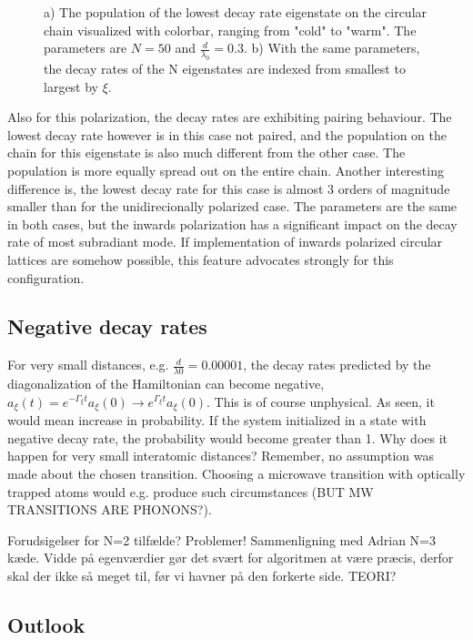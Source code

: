 \documentclass{article}
\begin{document}
\begin{figure}[H]
\begin{subfigure}[b]{0.49\textwidth}
        \caption{}
        \label{fig:circular_inwards_decayrates}
    \end{subfigure}
    \caption{a) The population of the lowest decay rate eigenstate on the circular chain visualized with colorbar, ranging from "cold" to "warm". The parameters are $N=50$ and $\frac{d}{\lambda_0}=0.3$. b) With the same parameters, the decay rates of the N eigenstates are indexed from smallest to largest by $\xi$. }
    \label{fig:circular_inwards}
\end{figure}

Also for this polarization, the decay rates are exhibiting pairing behaviour. The lowest decay rate however is in this case not paired, and the population on the chain for this eigenstate is also much different from the other case. The population is more equally spread out on the entire chain. Another interesting difference is, the lowest decay rate for this case is almost 3 orders of magnitude smaller than for the unidirecionally polarized case. The parameters are the same in both cases, but the inwards polarization has a significant impact on the decay rate of most subradiant mode. If implementation of inwards polarized circular lattices are somehow possible, this feature advocates strongly for this configuration. 

\subsection{Negative decay rates}

For very small distances, e.g. $\frac{d}{\lambda0} = 0.00001$, the decay rates predicted by the diagonalization of the Hamiltonian can become negative, $a_\xi(t)=e^{-\Gamma_\xi t} a_\xi (0) \rightarrow e^{\Gamma_\xi t} a_\xi (0)$. This is of course unphysical. As seen, it would mean increase in probability. If the system initialized in a state with negative decay rate, the probability would become greater than 1. Why does it happen for very small interatomic distances? Remember, no assumption was made about the chosen transition. Choosing a microwave transition with optically trapped atoms would e.g. produce such circumstances (BUT MW TRANSITIONS ARE PHONONS?). 

Forudsigelser for N=2 tilfælde? Problemer! Sammenligning med Adrian N=3 kæde. Vidde på egenværdier gør det svært for algoritmen at være præcis, derfor skal der ikke så meget til, før vi havner på den forkerte side. TEORI?

\subsection{Outlook}\label{sec:outlook}
\end{document}
